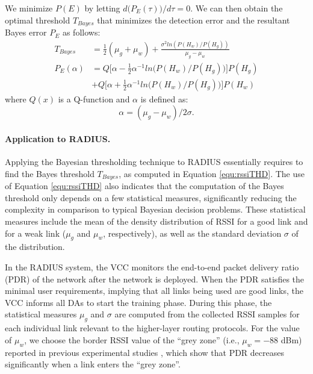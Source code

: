 We minimize $P(E)$ by letting $d\Big(P_E(\tau)\Big)/d\tau = 0$. We can then obtain the optimal threshold $T_{Bayes}$ that minimizes the detection error and the resultant Bayes error $P_E$ as follows:
\begin{align}  
	T_{Bayes} &= \frac{1}{2}(\mu_g + \mu_w) + \frac{\sigma^2 ln(P(H_w)/P(H_g))}{\mu_g - \mu_w} \label{equ:rssiTHD} \\
	P_E(\alpha) &= Q\bigg[\alpha - \frac{1}{2} \alpha^{-1} ln\Big(P(H_w)/P(H_g)\Big)\bigg]P(H_g) \nonumber \\
	& + Q\bigg[\alpha + \frac{1}{2} \alpha^{-1} ln\Big(P(H_w)/P(H_g)\Big)\bigg]P(H_w) \label{equ:error}   
\end{align} 
where $Q(x)$ is a Q-function \cite{wiki:qfunction} and $\alpha$ is defined as: 
\begin{equation} \label{equ:similarityMetric}
	\alpha = (\mu_g - \mu_w)/2\sigma. 
\end{equation}


\paragraph{Application to RADIUS.} Applying the Bayesian thresholding technique to RADIUS essentially requires to find the Bayes threshold $T_{Bayes}$, as computed in Equation \ref{equ:rssiTHD}. The use of Equation \ref{equ:rssiTHD} also indicates that the computation of the Bayes threshold only depends on a few statistical measures, significantly reducing the complexity in comparison to typical Bayesian decision problems. These statistical measures include the mean of the density distribution of RSSI for a good link and for a weak link ($\mu_{g}$ and $\mu_{w}$, respectively), as well as the standard deviation $\sigma$ of the distribution. 

In the RADIUS system, the VCC monitors the end-to-end packet delivery ratio (PDR) of the network after the network is deployed. When the PDR satisfies the minimal user requirements, implying that all links being used are good links, the VCC informs all DAs to start the training phase. During this phase, the statistical measures $\mu_{g}$ and $\sigma$ are computed from the collected RSSI samples for each individual link relevant to the higher-layer routing protocols. For the value of $\mu_{w}$, we choose the border RSSI value of the ``grey zone'' (i.e., $\mu_w = -88$ dBm) reported in previous experimental studies \cite{Lin:atpc, 7164923}, which show that PDR decreases significantly when a link enters the ``grey zone''. 

